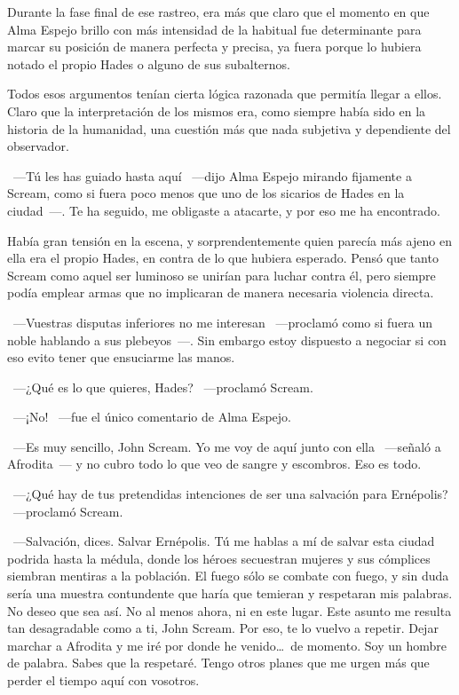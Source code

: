 Durante la fase final de ese rastreo, era más que claro que el momento en que Alma Espejo brillo con más intensidad de la habitual fue determinante para marcar su posición de manera perfecta y precisa, ya fuera porque lo hubiera notado el propio Hades o alguno de sus subalternos.

Todos esos argumentos tenían cierta lógica razonada que permitía llegar a ellos. Claro que la interpretación de los mismos era, como siempre había sido en la historia de la humanidad, una cuestión más que nada subjetiva y dependiente del observador.

~---Tú les has guiado hasta aquí ~---dijo Alma Espejo mirando fijamente a Scream, como si fuera poco menos que uno de los sicarios de Hades en la ciudad~---. Te ha seguido, me obligaste a atacarte, y por eso me ha encontrado.

Había gran tensión en la escena, y sorprendentemente quien parecía más ajeno en ella era el propio Hades, en contra de lo que hubiera esperado. Pensó que tanto Scream como aquel ser luminoso se unirían para luchar contra él, pero siempre podía emplear armas que no implicaran de manera necesaria violencia directa.

~---Vuestras disputas inferiores no me interesan ~---proclamó como si fuera un noble hablando a sus plebeyos~---. Sin embargo estoy dispuesto a negociar si con eso evito tener que ensuciarme las manos.

~---¿Qué es lo que quieres, Hades? ~---proclamó Scream.

~---¡No! ~---fue el único comentario de Alma Espejo.

~---Es muy sencillo, John Scream. Yo me voy de aquí junto con ella ~---señaló a Afrodita~--- y no cubro todo lo que veo de sangre y escombros. Eso es todo.

~---¿Qué hay de tus pretendidas intenciones de ser una salvación para Ernépolis? ~---proclamó Scream.

~---Salvación, dices. Salvar Ernépolis. Tú me hablas a mí de salvar esta ciudad podrida hasta la médula, donde los héroes secuestran mujeres y sus cómplices siembran mentiras a la población. El fuego sólo se combate con fuego, y sin duda sería una muestra contundente que haría que temieran y respetaran mis palabras. No deseo que sea así. No al menos ahora, ni en este lugar. Este asunto me resulta tan desagradable como a ti, John Scream. Por eso, te lo vuelvo a repetir. Dejar marchar a Afrodita y me iré por donde he venido\dots\ de momento. Soy un hombre de palabra. Sabes que la respetaré. Tengo otros planes que me urgen más que perder el tiempo aquí con vosotros.

